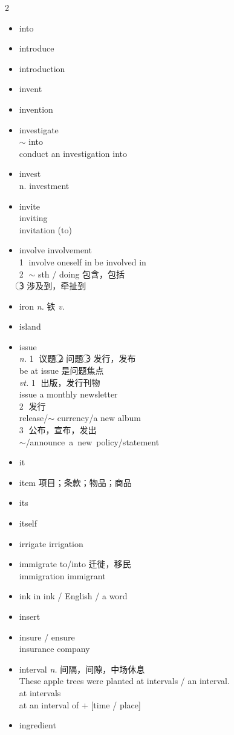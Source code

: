 \documentclass[../../book.tex]{subfiles}
\begin{document}
\begin{multicols}{2}
\begin{itemize}
\item[-] into
\item[-] introduce
\item[-] introduction
\item[-] invent
\item[-] invention
\item[-] investigate
\\$\sim$ into
\\conduct an investigation into
\item[-] invest
\\n. investment
\item[-] invite
\\inviting
\\invitation (to)
\item[-] involve \phantom{a} involvement
\\\textcircled{1} involve oneself in \phantom{a} be involved in
\\\textcircled{2} $\sim$ sth / doing 包含，包括
\\\textcircled{3} 涉及到，牵扯到
\item[-] iron \emph{n.} 铁 \emph{v.}
\item[-] island
\item[-] issue
\\\emph{n.} \textcircled{1} 议题 \textcircled{2} 问题 \textcircled{3} 发行，发布
\\\phantom{aaa} be at issue 是问题焦点
\\\emph{vt.} \textcircled{1} 出版，发行刊物 \\ issue a monthly newsletter
\\ \textcircled{2} 发行 \\ release/$\sim$ currency/a new album
\\ \textcircled{3} 公布，宣布，发出 \\ \mbox{$\sim$/announce a new policy/statement}
\item[-] it
\item[-] item 项目；条款；物品；商品
\item[-] its
\item[-] itself
\item[-] irrigate \phantom{a} irrigation
\item[-] immigrate to/into 迁徙，移民
\\immigration immigrant
\item[-] ink \phantom{a} in ink / English / a word
\item[-] insert
\item[-] insure / ensure
\\insurance company
\item[-] interval \emph{n.} 间隔，间隙，中场休息
\\These apple trees were planted at intervals / an interval.
\\at intervals
\\at an interval of + [time / place]
\item[-] ingredient
\end{itemize}
\end{multicols}
\end{document}
